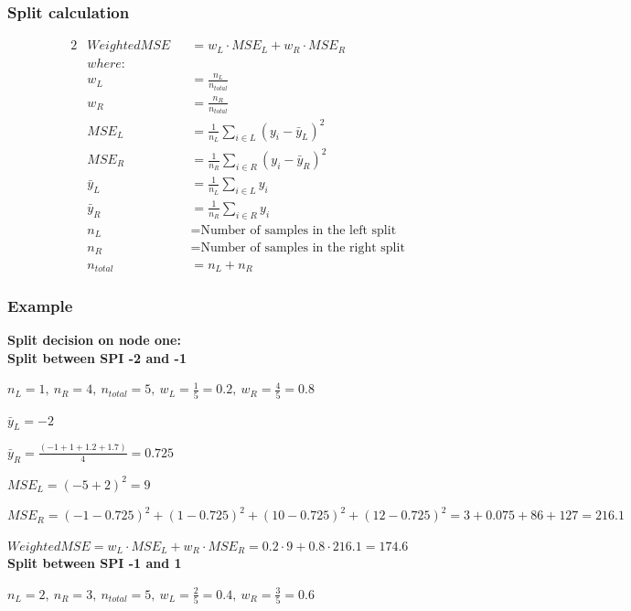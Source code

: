 \documentclass{article}
\begin{document}
\subsubsection{Split calculation}
\begin{alignat*}{2}
	 & Weighted MSE &  & = w_L \cdot MSE_L + w_R \cdot MSE_R                \\
	 & where:       &  &                                                    \\
	 & w_L          &  & = \frac{n_L}{n_{total}}                            \\
	 & w_R          &  & = \frac{n_R}{n_{total}}                            \\
	 & MSE_L        &  & = \frac{1}{n_L} \sum_{i \in L} (y_i - \bar{y}_L)^2 \\
	 & MSE_R        &  & = \frac{1}{n_R} \sum_{i \in R} (y_i - \bar{y}_R)^2 \\
	 & \bar{y}_L    &  & = \frac{1}{n_L} \sum_{i \in L} y_i                 \\
	 & \bar{y}_R    &  & = \frac{1}{n_R} \sum_{i \in R} y_i                 \\
	 & n_L          &  & = \text{Number of samples in the left split}       \\
	 & n_R          &  & = \text{Number of samples in the right split}      \\
	 & n_{total}    &  & = n_L + n_R
\end{alignat*}


\subsubsection{Example}
\textbf{Split decision on node one:}
\\
\textbf{Split between SPI -2 and -1}

$n_L = 1, \ n_R = 4, \ n_{total} = 5, \ w_L = \frac{1}{5} = 0.2, \ w_R = \frac{4}{5} = 0.8$

$\bar{y}_L = -2$

$\bar{y}_R = \frac{(-1 + 1 + 1.2 + 1.7)}{4} = 0.725$

$MSE_L = (-5 + 2)^2 = 9$

$MSE_R = (-1 - 0.725)^2 + (1 - 0.725)^2 + (10 - 0.725)^2 + (12 - 0.725)^2 = 3 + 0.075 + 86 + 127 = 216.1$

$Weighted MSE = w_L \cdot MSE_L + w_R \cdot MSE_R = 0.2 \cdot 9 + 0.8 \cdot 216.1 = 174.6$
\\
\textbf{Split between SPI -1 and 1}

$n_L = 2, \ n_R = 3, \ n_{total} = 5, \ w_L = \frac{2}{5} = 0.4, \ w_R = \frac{3}{5} = 0.6$
\end{document}
